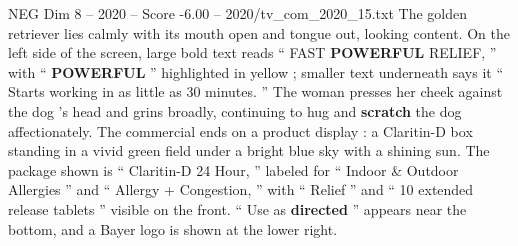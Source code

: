 \begin{textsample}{NEG Dim 8 – 2020 – Score -6.00 – 2020/tv\_com\_2020\_15.txt}
The golden retriever lies calmly with its mouth open and tongue out, looking content.
On the left side of the screen, large bold text reads “ FAST \textbf{POWERFUL} RELIEF, ” with “ \textbf{POWERFUL} ” highlighted in yellow ; smaller text underneath says it “ Starts working in as little as 30 minutes. ” The woman presses her cheek against the dog ’s head and grins broadly, continuing to hug and \textbf{scratch} the dog affectionately.
The commercial ends on a product display : a Claritin-D box standing in a vivid green field under a bright blue sky with a shining sun.
The package shown is “ Claritin-D 24 Hour, ” labeled for “ Indoor \& Outdoor Allergies ” and “ Allergy + Congestion, ” with “ Relief ” and “ 10 extended release tablets ” visible on the front. “ Use as \textbf{directed} ” appears near the bottom, and a Bayer logo is shown at the lower right.

\end{textsample}
